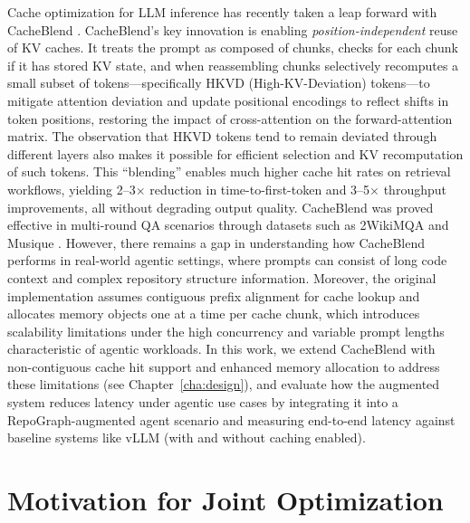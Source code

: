 Cache optimization for LLM inference has recently taken a leap forward with CacheBlend \cite{yao2025cacheblendfastlargelanguage}. CacheBlend's key innovation is enabling \emph{position-independent} reuse of KV caches. It treats the prompt as composed of chunks, checks for each chunk if it has stored KV state, and when reassembling chunks selectively recomputes a small subset of tokens---specifically HKVD (High-KV-Deviation) tokens---to mitigate attention deviation and update positional encodings to reflect shifts in token positions, restoring the impact of cross-attention on the forward-attention matrix. The observation that HKVD tokens tend to remain deviated through different layers also makes it possible for efficient selection and KV recomputation of such tokens. This ``blending'' enables much higher cache hit rates on retrieval workflows, yielding 2--3$\times$ reduction in time-to-first-token and 3--5$\times$ throughput improvements, all without degrading output quality. CacheBlend was proved effective in multi-round QA scenarios through datasets such as 2WikiMQA and Musique \cite{ho2020constructingmultihopqadataset, trivedi2022musiquemultihopquestionssinglehop} . However, there remains a gap in understanding how CacheBlend performs in real-world agentic settings, where prompts can consist of long code context and complex repository structure information. Moreover, the original implementation assumes contiguous prefix alignment for cache lookup and allocates memory objects one at a time per cache chunk, which introduces scalability limitations under the high concurrency and variable prompt lengths characteristic of agentic workloads. In this work, we extend CacheBlend with non-contiguous cache hit support and enhanced memory allocation to address these limitations (see Chapter~\ref{cha:design}), and evaluate how the augmented system reduces latency under agentic use cases by integrating it into a RepoGraph-augmented agent scenario and measuring end-to-end latency against baseline systems like vLLM (with and without caching enabled).

\section{Motivation for Joint Optimization}
\label{sec:bg_motivation}


